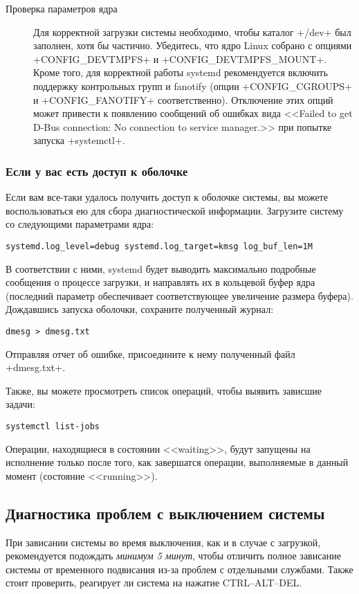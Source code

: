 \documentclass[10pt,oneside,a4paper]{article}
\begin{document}
\begin{description}
\item[Проверка параметров ядра] Для корректной загрузки системы необходимо,
	чтобы каталог +/dev+ был заполнен, хотя бы частично. Убедитесь, что ядро
	Linux собрано с опциями +CONFIG_DEVTMPFS+ и +CONFIG_DEVTMPFS_MOUNT+.
	Кроме того, для корректной работы systemd рекомендуется включить
	поддержку контрольных групп и fanotify (опции +CONFIG_CGROUPS+ и 
	+CONFIG_FANOTIFY+ соответственно). Отключение этих опций может привести
	к появлению сообщений об ошибках вида <<Failed to get D-Bus
	connection: No connection to service manager.>> при попытке запуска
	+systemctl+.
\end{description}

\subsubsection{Если у вас есть доступ к оболочке}
\label{sssec:kmsg}

Если вам все-таки удалось получить доступ к оболочке системы, вы можете
воспользоваться ею для сбора диагностической информации. Загрузите систему со
следующими параметрами ядра:
\begin{Verbatim}
systemd.log_level=debug systemd.log_target=kmsg log_buf_len=1M
\end{Verbatim}
В соответствии с ними, systemd будет выводить максимально подробные сообщения о
процессе загрузки, и направлять их в кольцевой буфер ядра (последний параметр
обеспечивает соответствующее увеличение размера буфера). Дождавшись запуска
оболочки, сохраните полученный журнал:
\begin{Verbatim}
dmesg > dmesg.txt
\end{Verbatim}
Отправляя отчет об ошибке, присоедините к нему полученный файл +dmesg.txt+.

Также, вы можете просмотреть список операций, чтобы выявить зависшие задачи:
\begin{Verbatim}
systemctl list-jobs
\end{Verbatim}
Операции, находящиеся в состоянии <<waiting>>, будут запущены на исполнение
только после того, как завершатся операции, выполняемые в данный момент
(состояние <<running>>).

\subsection{Диагностика проблем с выключением системы}

При зависании системы во время выключения, как и в случае с загрузкой,
рекомендуется подождать \emph{минимум 5 минут}, чтобы отличить полное зависание
системы от временного подвисания из-за проблем с отдельными службами. Также
стоит проверить, реагирует ли система на нажатие CTRL--ALT--DEL.
\end{document}
